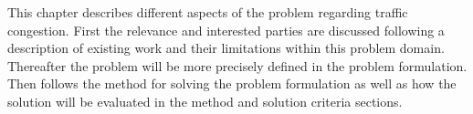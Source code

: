 This chapter describes different aspects of the problem regarding traffic congestion. First the relevance and interested parties are discussed following a description of existing work and their limitations within this problem domain. Thereafter the problem will be more precisely defined in the problem formulation. Then follows the method for solving the problem formulation as well as how the solution will be evaluated in the method and solution criteria sections. 